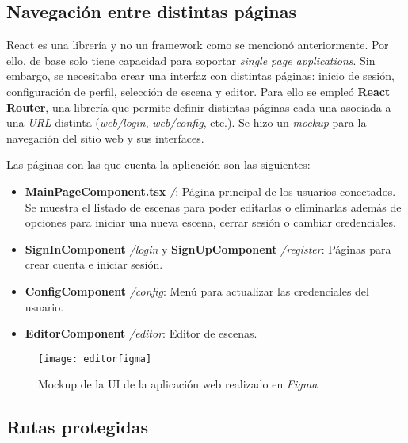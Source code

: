 \subsection{Navegación entre distintas páginas}

React es una librería y no un framework como se mencionó anteriormente. Por ello, de base solo tiene capacidad para soportar \textit{single page applications}. Sin embargo, se necesitaba crear una interfaz con distintas páginas: inicio de sesión, configuración de perfil, selección de escena y editor. Para ello se empleó \textbf{React Router}\cite{reactrouter}, una librería que permite definir distintas páginas cada una asociada a una \textit{URL} distinta (\textit{web/login}, \textit{web/config}, etc.). Se hizo un \textit{mockup} para la navegación del sitio web y sus interfaces.

Las páginas con las que cuenta la aplicación son las siguientes:

\begin{itemize}
    \item \textbf{MainPageComponent.tsx} \textit{/}: Página principal de los usuarios conectados. Se muestra el listado de escenas para poder editarlas o eliminarlas además de opciones para iniciar una nueva escena, cerrar sesión o cambiar credenciales.
    \item \textbf{SignInComponent} \textit{/login} y \textbf{SignUpComponent} \textit{/register}: Páginas para crear cuenta e iniciar sesión.
    \item \textbf{ConfigComponent} \textit{/config}: Menú para actualizar las credenciales del usuario.
    \item \textbf{EditorComponent} \textit{/editor}: Editor de escenas.
\end{itemize}

\begin{figure}[h]
    \centering
    \texttt{[image: editorfigma]}
    \caption[Mockup de la UI de la aplicación web]{Mockup de la UI de la aplicación web realizado en \textit{Figma}}
\end{figure}

\subsection{Rutas protegidas}

